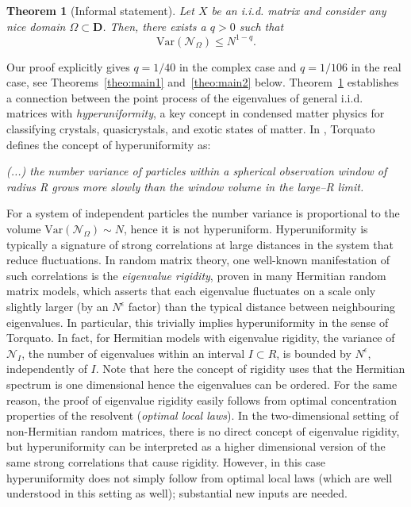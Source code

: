 \documentclass[10pt]{amsart}
\newtheorem{theorem}{Theorem}[section]
\numberwithin{equation}{section}
\begin{document}
\begin{theorem}[Informal statement]\label{theo:informal}
Let $X$ be an i.i.d. matrix and consider any nice domain $\Omega\subset\mathbf{D}$. Then, there exists a $q>0$ such that
\begin{equation}
\label{eq:hyp}
\mathrm{Var}(\mathcal{N}_\Omega)\le N^{1-q}.
\end{equation} 
\end{theorem}

Our proof explicitly gives $q=1/40$ in the complex case and $q=1/106$ in the real case, see Theorems~\ref{theo:main1} and~\ref{theo:main2} below. Theorem~\ref{theo:informal} establishes a connection between the point process of the eigenvalues of general i.i.d. matrices with \emph{hyperuniformity}, a key concept in condensed matter physics for classifying crystals, quasicrystals, and exotic states of matter. In \cite[Section 1]{Torquato18}, Torquato defines the concept of hyperuniformity as:

\smallskip

\emph{(...) the number variance of particles within a spherical observation window of radius R grows more
slowly than the window volume in the large–R limit.}

\smallskip


For a system of independent particles the number variance is proportional to the volume $\mathrm{Var}(\mathcal{N}_\Omega)\sim N$, hence it is not hyperuniform. Hyperuniformity is typically a signature of strong correlations at large distances in the system that reduce fluctuations.  In random matrix theory, one well-known manifestation of such correlations is the \emph{eigenvalue rigidity}, proven in many Hermitian random matrix models, which asserts that each eigenvalue fluctuates on a  scale only slightly larger (by an $N^\epsilon$ factor) than the typical distance between neighbouring eigenvalues.  In particular, this trivially implies hyperuniformity in the sense of Torquato. In fact, for Hermitian models with eigenvalue rigidity, the variance of $\mathcal{N}_I$, the number of eigenvalues within an interval $I\subset R$, is bounded by $N^\epsilon$, independently of $I$. Note that  here the concept of rigidity uses that the Hermitian spectrum is one dimensional hence the eigenvalues can be ordered. For the same reason, the proof of eigenvalue rigidity easily follows from optimal concentration properties of the resolvent (\emph{optimal local laws}). In the two-dimensional setting of non-Hermitian random matrices, there is no direct concept of eigenvalue rigidity, but hyperuniformity can be interpreted as a higher dimensional version of the same strong correlations that cause rigidity. However, in this case hyperuniformity does not simply follow from optimal local laws (which are well understood in this setting as well); substantial new inputs are needed.
\end{document}

